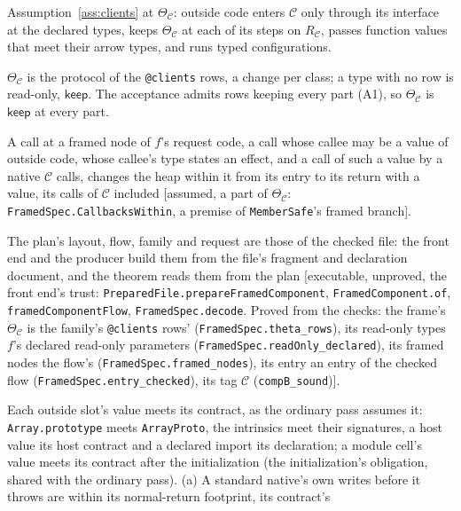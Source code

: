 \documentclass[10pt,a4paper]{article}
\theoremstyle{definition}
\theoremstyle{remark}
\newcommand{\kw}[1]{\mathsf{#1}}
\newcommand{\keep}{\kw{keep}}
\newcommand{\code}[1]{\texttt{#1}}
\newcommand{\lean}[1]{\texttt{\small #1}}
\newcommand{\status}[1]{\textsf{\small[#1]}}
\newcommand{\cC}{\mathcal{C}}
\begin{document}
\begin{description}[leftmargin=1.5em,style=nextline]
\item[The client obligation] Assumption~\ref{ass:clients} at $\Theta_\cC$:
outside code enters $\cC$ only through its interface at the declared
types, keeps $\Theta_\cC$ at each of its steps on $R_\cC$, passes function
values that meet their arrow types, and runs typed configurations.
\item[The client row] $\Theta_\cC$ is the protocol of the \code{@clients}
rows, a change per class; a type with no row is read-only, $\keep$. The
acceptance admits rows keeping every part (A1), so $\Theta_\cC$ is
$\keep$ at every part.
\item[The callback row] A call at a framed node of $f$'s request code, a call whose callee may be a value of outside code, whose callee's type states an effect, and a call of such a value by a native $\cC$ calls, changes the heap within it from its entry to its return with a value, its calls of $\cC$ included \status{assumed, a part of $\Theta_\cC$: \lean{FramedSpec.CallbacksWithin}, a premise of \lean{MemberSafe}'s framed branch}.\par
\item[The binding to the file] The plan's layout, flow, family and request are those of the checked file: the front end and the producer build them from the file's fragment and declaration document, and the theorem reads them from the plan \status{executable, unproved, the front end's trust: \lean{PreparedFile.prepareFramedComponent}, \lean{FramedComponent.of}, \lean{framedComponentFlow}, \lean{FramedSpec.decode}. Proved from the checks: the frame's $\Theta_\cC$ is the family's \code{@clients} rows' (\lean{FramedSpec.theta\_rows}), its read-only types $f$'s declared read-only parameters (\lean{FramedSpec.readOnly\_declared}), its framed nodes the flow's (\lean{FramedSpec.framed\_nodes}), its entry an entry of the checked flow (\lean{FramedSpec.entry\_checked}), its tag $\cC$ (\lean{compB\_sound})}.\par
\item[The natives] Each outside slot's value meets its contract, as the
ordinary pass assumes it: \code{Array.prototype} meets \code{ArrayProto},
the intrinsics meet their signatures, a host value its host contract and
a declared import its declaration; a module cell's value meets its
contract after the initialization (the initialization's obligation,
shared with the ordinary pass). (a) A standard native's own writes before
it throws are within its normal-return footprint, its contract's

\end{description}
\end{document}
